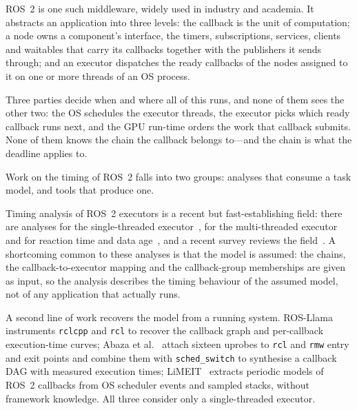 ROS~2 is one such middleware, widely used in industry and academia. It abstracts
an application into three levels: the callback is the unit of computation; a
node owns a component's interface, the timers, subscriptions, services, clients
and waitables that carry its callbacks together with the publishers it sends
through; and an executor dispatches the ready callbacks of the nodes assigned to
it on one or more threads of an OS process.

Three parties decide when and where all of this runs, and none of them sees the
other two: the OS schedules the executor threads, the executor picks which ready
callback runs next, and the GPU run-time orders the work that callback submits.
None of them knows the chain the callback belongs to---and the chain is what the
deadline applies to.

Work on the timing of ROS~2 falls into two groups: analyses that consume a task
model, and tools that produce one.

Timing analysis of ROS~2 executors is a recent but fast-establishing field:
there are analyses for the single-threaded
executor~\cite{casini-19-reservationbased}, for the multi-threaded
executor~\cite{arafat-2026-mtexecutor-cbgroups} and for reaction time and data
age~\cite{teper-2024-end2endmtexecutoranalysisoptimization}, and a recent survey
reviews the field~\cite{casini-2025-surveyros2}. A shortcoming common to these
analyses is that the model is assumed: the chains, the callback-to-executor
mapping and the callback-group memberships are given as input, so the analysis
describes the timing behaviour of the assumed model, not of any application that
actually runs.

A second line of work recovers the model from a running system.
ROS-Llama~\cite{blass-2021-rosllama-paper} instruments \texttt{rclcpp} and
\texttt{rcl} to recover the callback graph and per-callback execution-time
curves; Abaza et al.~\cite{abaza-2024-ros2modelsynthesis} attach sixteen uprobes
to \texttt{rcl} and \texttt{rmw} entry and exit points and combine them with
\texttt{sched\_switch} to synthesise a callback DAG with measured execution
times; LiMEIT~\cite{brandenburg-2026-limeit} extracts periodic models of ROS~2
callbacks from OS scheduler events and sampled stacks, without framework
knowledge. All three consider only a single-threaded executor.

